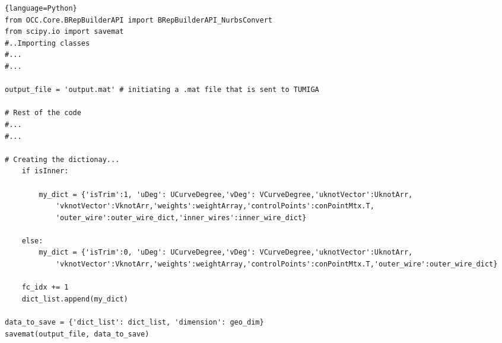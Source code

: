 

\lstset{style=python}
\begin{adjustwidth}{-0.5cm}{-0.5cm}
\begin{lstlisting}{language=Python}
from OCC.Core.BRepBuilderAPI import BRepBuilderAPI_NurbsConvert
from scipy.io import savemat
#..Importing classes
#...
#...

output_file = 'output.mat' # initiating a .mat file that is sent to TUMIGA

# Rest of the code
#...
#...

# Creating the dictionay...
    if isInner:
            
        my_dict = {'isTrim':1, 'uDeg': UCurveDegree,'vDeg': VCurveDegree,'uknotVector':UknotArr,
            'vknotVector':VknotArr,'weights':weightArray,'controlPoints':conPointMtx.T,
            'outer_wire':outer_wire_dict,'inner_wires':inner_wire_dict}
        
    else:
        my_dict = {'isTrim':0, 'uDeg': UCurveDegree,'vDeg': VCurveDegree,'uknotVector':UknotArr,
            'vknotVector':VknotArr,'weights':weightArray,'controlPoints':conPointMtx.T,'outer_wire':outer_wire_dict}
        
    fc_idx += 1
    dict_list.append(my_dict)  
    
data_to_save = {'dict_list': dict_list, 'dimension': geo_dim}
savemat(output_file, data_to_save)

\end{lstlisting}
\end{adjustwidth}
